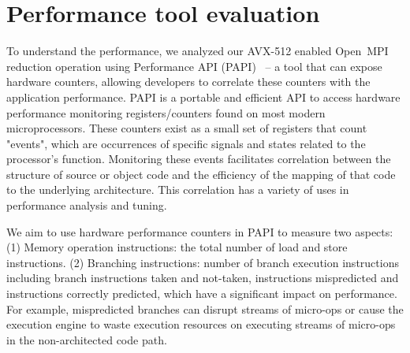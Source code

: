 \documentclass[5p,times,twocolumn]{elsarticle}
\newcommand{\ompi}[0]{Open~MPI\xspace}
\begin{document}
\section{Performance tool evaluation}\label{sec:perf}
To understand the performance, we analyzed our AVX-512 enabled \ompi reduction
operation using Performance API (PAPI)~\cite{papi} -- a tool that can expose
hardware counters, allowing developers to correlate these counters
with the application performance.
PAPI is a portable and efficient API to access hardware performance
monitoring registers/counters found on most modern microprocessors.
These counters exist
as a small set of registers that count "events", which are occurrences of specific signals
and states related to the processor's function. Monitoring these events facilitates
correlation between the structure of source or object code and the efficiency of the mapping
of that code to the underlying architecture. This correlation has a variety of uses in
performance analysis and tuning.


We aim to use hardware performance counters in PAPI to measure two aspects:
(1) Memory operation instructions: the total number of load and store instructions.
(2) Branching instructions: number of branch execution instructions including branch instructions taken and not-taken,
instructions mispredicted and instructions correctly predicted, which have a significant impact on performance.
For example, mispredicted branches can disrupt streams of micro-ops or cause
the execution engine to waste execution resources on executing
streams of micro-ops in the non-architected code path.
\end{document}
